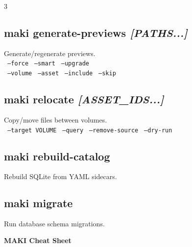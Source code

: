 \documentclass[a4paper,landscape,8pt]{article}
\newcommand{\opt}[1]{\texttt{\scriptsize\color{maki-stone} #1}}
\begin{document}
\begin{multicols}{3}
\subsection{maki generate-previews \textit{[PATHS...]}}
Generate/regenerate previews. \\
\opt{--force} \opt{--smart} \opt{--upgrade} \\
\opt{--volume} \opt{--asset} \opt{--include} \opt{--skip}

\subsection{maki relocate \textit{[ASSET\_IDS...]}}
Copy/move files between volumes. \\
\opt{--target VOLUME} \opt{--query} \opt{--remove-source} \opt{--dry-run}

\subsection{maki rebuild-catalog}
Rebuild SQLite from YAML sidecars.

\subsection{maki migrate}
Run database schema migrations.

\end{multicols}

\newpage


\begin{center}
{\Large\bfseries\color{maki-salmon} MAKI Cheat Sheet} 
\end{center}
\vspace{-4pt}
\end{document}
